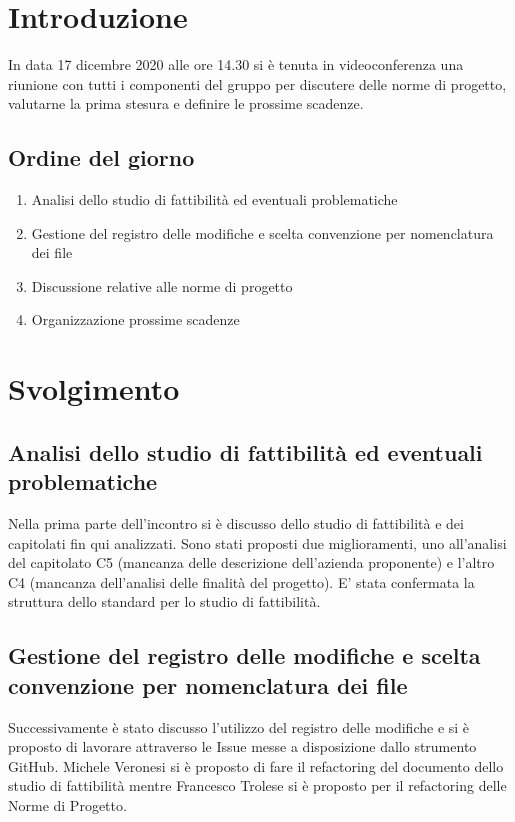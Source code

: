 \section{Introduzione}
In data 17 dicembre 2020 alle ore 14.30 si è tenuta in videoconferenza una riunione con tutti i componenti del gruppo per discutere delle norme di progetto, valutarne la prima stesura e definire le prossime scadenze.
\subsection{Ordine del giorno}
\begin{enumerate}
    \item Analisi dello studio di fattibilità ed eventuali problematiche
    \item Gestione del registro delle modifiche e scelta convenzione per nomenclatura dei file
    \item Discussione relative alle norme di progetto
    \item Organizzazione prossime scadenze 
\end{enumerate}

\section{Svolgimento}
\subsection{Analisi dello studio di fattibilità ed eventuali problematiche}
Nella prima parte dell'incontro si è discusso dello studio di fattibilità e dei capitolati fin qui analizzati. Sono stati proposti due miglioramenti, uno all'analisi del capitolato C5 (mancanza delle descrizione dell'azienda proponente) e l'altro C4 (mancanza dell'analisi delle finalità del progetto). E' stata confermata la struttura dello standard per lo studio di fattibilità. 

\subsection{Gestione del registro delle modifiche e scelta convenzione per nomenclatura dei file}
Successivamente è stato discusso l'utilizzo del registro delle modifiche e si è proposto di lavorare attraverso le Issue messe a disposizione dallo strumento GitHub. Michele Veronesi si è proposto di fare il refactoring del documento  dello studio di fattibilità mentre Francesco Trolese si è proposto per il refactoring delle Norme di Progetto. 

